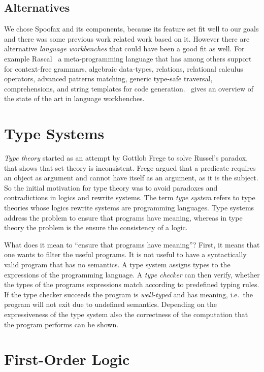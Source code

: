 \subsection{Alternatives}
We chose Spoofax and its components, because its feature set fit well
to our goals and there was some previous work related work based on
it. However there are alternative \textit{language workbenches} that
could have been a good fit as well. For example
Rascal~\cite{klint2009rascal} a meta-programming language that has
among others support for context-free grammars, algebraic data-types,
relations, relational calculus operators, advanced patterns matching,
generic type-safe traversal, comprehensions, and string templates for
code generation.~\cite{workbenches} gives an overview of the state of
the art in language workbenches.

\section{Type Systems}
\textit{Type theory} started as an attempt by Gottlob Frege to solve
Russel's paradox, that shows that \naive{} set theory is
inconsistent. Frege argued that a predicate requires an object as
argument and cannot have itself as an argument, as it is the
subject. So the initial motivation for type theory was to avoid
paradoxes and contradictions in logics and rewrite systems. The term
\textit{type system} refers to type theories whose logics rewrite
systems are programming languages. Type systems address the problem to
ensure that programs have meaning, whereas in type theory the problem
is the ensure the consistency of a logic.

What does it mean to ``ensure that programs have meaning''? First, it
means that one wants to filter the useful programs. It is not useful
to have a syntactically valid program that has no semantics. A type
system assigns types to the expressions of the programming language. A
\textit{type checker} can then verify, whether the types of the
programs expressions match according to predefined typing rules. If
the type checker succeeds the program is \textit{well-typed} and has
meaning, i.e.\ the program will not exit due to undefined
semantics. Depending on the expressiveness of the type system also the
correctness of the computation that the program performs can be shown.

\section{First-Order Logic}

